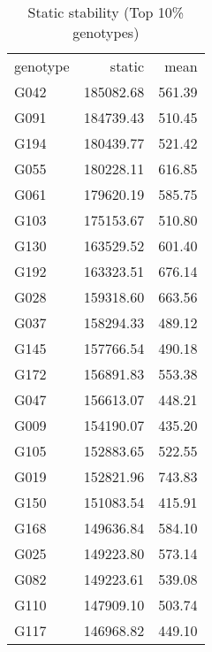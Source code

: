 \documentclass[a4paper,11pt]{article}\usepackage[]{graphicx}\usepackage[]{color}
\begin{document}
\begin{table}[ht]
\begin{flushleft}
\caption{Static stability (Top 10\% genotypes)} 
\label{static}
\begin{tabular}{lrr}
 genotype & static & mean \\ 
 G042 & 185082.68 & 561.39 \\ 
  G091 & 184739.43 & 510.45 \\ 
  G194 & 180439.77 & 521.42 \\ 
  G055 & 180228.11 & 616.85 \\ 
  G061 & 179620.19 & 585.75 \\ 
  G103 & 175153.67 & 510.80 \\ 
  G130 & 163529.52 & 601.40 \\ 
  G192 & 163323.51 & 676.14 \\ 
  G028 & 159318.60 & 663.56 \\ 
  G037 & 158294.33 & 489.12 \\ 
  G145 & 157766.54 & 490.18 \\ 
  G172 & 156891.83 & 553.38 \\ 
  G047 & 156613.07 & 448.21 \\ 
  G009 & 154190.07 & 435.20 \\ 
  G105 & 152883.65 & 522.55 \\ 
  G019 & 152821.96 & 743.83 \\ 
  G150 & 151083.54 & 415.91 \\ 
  G168 & 149636.84 & 584.10 \\ 
  G025 & 149223.80 & 573.14 \\ 
  G082 & 149223.61 & 539.08 \\ 
  G110 & 147909.10 & 503.74 \\ 
  G117 & 146968.82 & 449.10 \\ 
  \end{tabular}
\end{flushleft}
\end{table}
\end{document}
